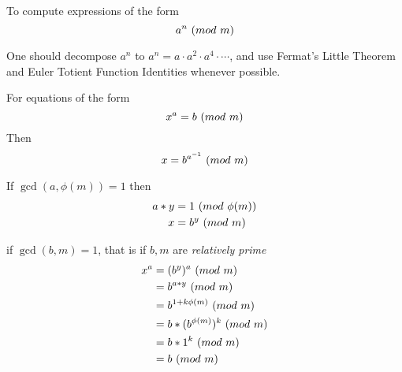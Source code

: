 \begin{remark}
    To compute expressions of the form
    \begin{equation}
        a^n \ (\relax{mod}\ m)
    \end{equation}
    
    One should decompose $a^n$ to $a^n = a \cdot a^2 \cdot a^4 \cdot \cdots$, and use Fermat's Little Theorem and Euler Totient Function Identities whenever possible.
\end{remark}

\begin{remark}
    For equations of the form
    \begin{equation}
        x^a = b \ (\relax{mod}\ m)
    \end{equation}
    Then
    \begin{equation}
        x = b^{{a}^{-1}} \ (\relax{mod}\ m)
    \end{equation}
    
    If $\gcd(a, \phi(m)) = 1$ then
    \begin{align}
        a \ast y &= 1 \ (\relax{mod}\ \phi(m)) \\
        x        &= b^y \ (\relax{mod}\ m)
    \end{align}
    
    if $\gcd(b, m) = 1$, that is if $b, m$ are \textit{relatively prime}
    \begin{align}
        x^a &= (b^y)^a \ (\relax{mod}\ m) \\
            &= b^{a \ast y} \ (\relax{mod}\ m) \\
            &= b^{1 + k \phi(m)} \ (\relax{mod}\ m) \\
            &= b \ast (b^{\phi(m)})^k \ (\relax{mod}\ m) \\
            &= b \ast 1^k \ (\relax{mod}\ m) \\
            &= b \ (\relax{mod}\ m)
    \end{align}
\end{remark}
